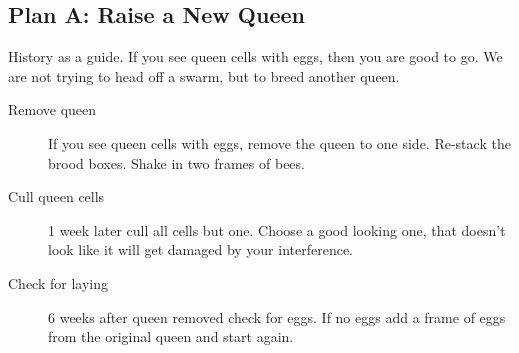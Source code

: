 \subsection{Plan A: Raise a New Queen}

History as a guide.
If you see queen cells with eggs,
then you are good to go.
We are not trying to head off a swarm,
but to breed another queen.

\begin{description}
  \item[Remove queen] If you see queen cells with eggs, remove the queen to one side.
    Re-stack the brood boxes.
    Shake in two frames of bees.
  \item[Cull queen cells] 1 week later cull all cells but one.
    Choose a good looking one,
    that doesn't look like it will get damaged by your interference.
  \item[Check for laying] 6 weeks after queen removed check for eggs.
    If no eggs add a frame of eggs from the original queen
    and start again. 
\end{description}

